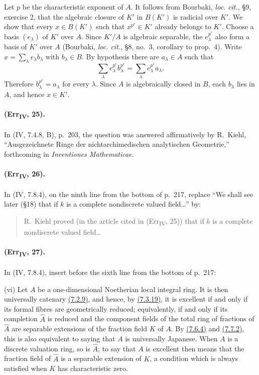Let $p$ be the characteristic exponent of $A$.  It follows from
Bourbaki, \emph{loc. cit.}, \S9, exercise 2, that the algebraic closure
of $K'$ in $B(K')$ is radicial over $K'$.  We show that every
$x\in B(K')$ such that $x^{p^r}\in K'$ already belongs to $K'$.
Choose a basis $(e_\lambda)$ of $K'$ over $A$.  Since $K'/A$ is
algebraic separable, the $e_\lambda^{p^r}$ also form a basis of $K'$ over
$A$ (Bourbaki, \emph{loc. cit.}, \S8, no.~3, corollary to prop.~4).
Write $x=\sum_\lambda e_\lambda b_\lambda$ with $b_\lambda\in B$.  By
hypothesis there are $a_\lambda\in A$ such that
\[
 \sum_\lambda e_\lambda^{p^r}b_\lambda^{p^r}
 =\sum_\lambda e_\lambda^{p^r}a_\lambda.
\]
Therefore $b_\lambda^{p^r}=a_\lambda$ for every $\lambda$.  Since $A$
is algebraically closed in $B$, each $b_\lambda$ lies in $A$, and hence
$x\in K'$.

\paragraph{(Err\textsubscript{IV}, 25).}
In (IV, 7.4.8, B), p.~203, the question was answered affirmatively by
R.~Kiehl, ``Ausgezeichnete Ringe der nichtarchimedischen analytischen
Geometrie,'' forthcoming in \emph{Inventiones Mathematicae}.

\paragraph{(Err\textsubscript{IV}, 26).}
In (IV, 7.8.4), on the ninth line from the bottom of p.~217, replace
``We shall see later (\S18) that if $k$ is a complete nondiscrete valued
field\ldots'' by:
\begin{quote}
R.~Kiehl proved (in the article cited in
(Err\textsubscript{IV}, 25)) that if $k$ is a complete nondiscrete
valued field\ldots
\end{quote}

\paragraph{(Err\textsubscript{IV}, 27).}
In (IV, 7.8.4), insert before the sixth line from the bottom of p.~217:

\smallskip
\noindent
\textup{(vi)} Let $A$ be a one-dimensional Noetherian local integral
ring.  It is then universally catenary {\hyperlink{ega4.c04.cor.7-2-9}{(7.2.9)}}, and hence, by {\hyperlink{ega4.c04.statement.7-3-19}{(7.3.19)}},
it is excellent if and only if its formal fibres are geometrically
reduced; equivalently, if and only if its completion $\widehat A$ is
reduced and the component fields of the total ring of fractions of
$\widehat A$ are separable extensions of the fraction field $K$ of
$A$.  By {\hyperlink{ega4.c04.thm.7-6-4}{(7.6.4)}} and {\hyperlink{ega4.c04.thm.7-7-2}{(7.7.2)}}, this is also equivalent to saying that
$A$ is universally Japanese.  When $A$ is a discrete valuation ring,
so is $\widehat A$; to say that $A$ is excellent then means that the
fraction field of $\widehat A$ is a separable extension of $K$, a
condition which is always satisfied when $K$ has characteristic zero.

